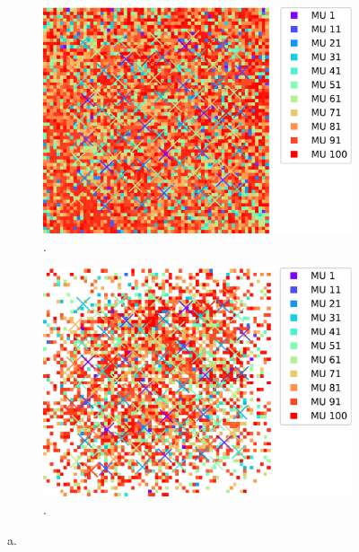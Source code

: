 \begin{figure}
  \begin{subfigure}[t]{0.48\textwidth}%
    \centering%
    \includegraphics[width=\textwidth]{images/motor_unit_assignment/MU_fibre_distribution_67x67_100_2d_fiber_distribution.pdf}%
    \caption{.}%
    \label{fig:MU_fibre_distribution_67x67_100_2d_fiber_distribution}%
  \end{subfigure}
  \quad
  \begin{subfigure}[t]{0.48\textwidth}%
    \centering%
    \includegraphics[width=\textwidth]{images/motor_unit_assignment/MU_fibre_distribution_sparse_67x67_100_2d_fiber_distribution.pdf}%
    \caption{.}%
    \label{fig:MU_fibre_distribution_sparse_67x67_100_2d_fiber_distribution}%
  \end{subfigure}
  \caption{a.}%
  \label{fig:extraction_result}%
\end{figure}%


